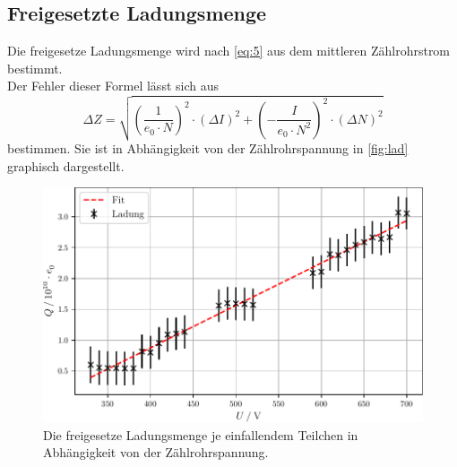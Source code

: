 \subsection{Freigesetzte Ladungsmenge}

Die freigesetze Ladungsmenge wird nach \autoref{eq:5} aus dem mittleren Zählrohrstrom
bestimmt.\\
Der Fehler dieser Formel lässt sich aus %
\begin{equation*}
  \Delta Z = \sqrt{ ( \frac{1}{e_0 \cdot N} )^2 \cdot (\Delta I)^2 + (- \frac{I}{e_0 \cdot N^2})^2 \cdot (\Delta N)^2}
\end{equation*}
bestimmen.
Sie ist in Abhängigkeit von der Zählrohrspannung in \autoref{fig:lad} graphisch dargestellt.\\
\begin{figure}[H]
  \centering
  \includegraphics[width=12cm]{content/ladung.pdf}
  \caption{Die freigesetze Ladungsmenge je einfallendem Teilchen in Abhängigkeit von der Zählrohrspannung.}
  \label{fig:lad}
\end{figure}
